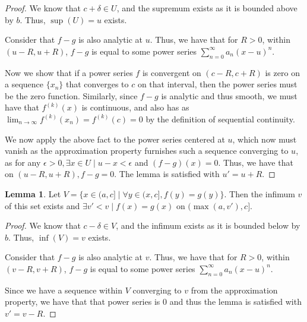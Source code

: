 \documentclass[12pt,letterpaper]{article}
\theoremstyle{definition}
\newtheorem*{lemma}{Lemma}
\begin{document}
\begin{proof}
  We know that $c + \delta \in U$, and the supremum exists as it is
  bounded above by $b$. Thus, $\sup(U) = u$ exists.
  
  Consider that $f - g$ is also analytic at $u$. Thus, we have that for $R > 0$, within $(u -
  R, u + R)$, $f - g$ is equal to some power series $\sum_{n=0}^\infty a_n(x -
  u)^n$. 

  Now we show that if a power series $f$ is convergent on $(c - R, c + R)$ is zero on
  a sequence $\{x_n\}$ that converges to $c$ on that interval, then the power series must
  be the zero function. Similarly, since $f - g$ is
  analytic and thus smooth, we must have that $f^{(k)}(x)$ is continuous, and
  also has as $\lim_{n\rightarrow \infty}f^{(k)}(x_n) = f^{(k)}(c) = 0$ by the
  definition of sequential continuity.


  We now apply the above fact to the power series centered at $u$, which now
  must vanish as the approximation property furnishes such a sequence
  converging to $u$, as for any $\epsilon > 0, \exists x \in U \mid u - x <
  \epsilon$ and $(f-g)(x) = 0$. Thus, we have that on $(u - R, u + R), f - g =
  0$. The lemma is satisfied with $u' = u + R$.
\end{proof}

\begin{lemma}
  Let $V = \{x \in (a,c] \mid \forall y \in (x,c], f(y) = g(y)\}$. Then the infimum $v$ of this set
  exists and $\exists v' < v \mid f(x) = g(x)$ on $(\max(a,v'), c]$.
\end{lemma}

\begin{proof}
  We know that $c-\delta \in V$, and the infimum exists as it is
  bounded below by $b$. Thus, $\inf(V) = v$ exists.
  
  Consider that $f - g$ is also analytic at $v$. Thus, we have that for $R > 0$, within $(v -
  R, v + R)$, $f - g$ is equal to some power series $\sum_{n=0}^\infty a_n(x -
  u)^n$. 

  Since we have a sequence within $V$ converging to $v$ from the approximation
  property, we have that that power series is $0$ and thus the lemma is
  satisfied with $v' = v - R$.
\end{proof}
\end{document}
